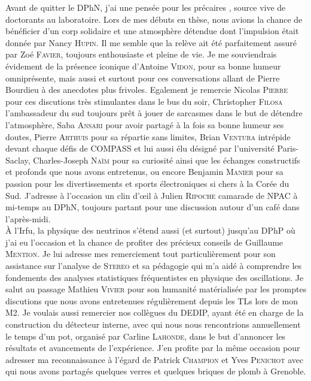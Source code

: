 Avant de quitter le DPhN, j'ai une pensée pour les \og précaires \fg{}, source vive de doctorants au laboratoire. Lors de mes débuts en thèse, nous avions la chance de bénéficier d'un corp solidaire et une atmosphère détendue dont l'impulsion était donnée par Nancy \textsc{Hupin}. Il me semble que la relève ait été parfaitement assuré par Zoé \textsc{Favier}, toujours enthousiaste et pleine de vie. Je me souviendrais évidement de la présence iconique d'Antoine \textsc{Vidon}, pour sa bonne humeur omniprésente, mais aussi et surtout pour ces conversations allant de Pierre Bourdieu à des anecdotes plus frivoles. Egalement je remercie Nicolas \textsc{Pierre} pour ces discutions très stimulantes dans le bus du soir, Christopher \textsc{Filosa} l'ambassadeur du sud toujours prêt à jouer de sarcasmes dans le but de détendre l'atmosphère, Saba \textsc{Ansari} pour avoir partagé à la fois sa bonne humeur ses doutes, Pierre \textsc{Arthuis} pour sa répartie sans limites, Brian \textsc{Ventura} intrépide devant chaque défis de COMPASS et lui aussi élu désigné par l'université Paris-Saclay, Charles-Joseph \textsc{Naïm} pour sa curiosité ainsi que les échanges constructifs et profonds que nous avons entretenus, ou encore Benjamin \textsc{Manier} pour sa passion pour les divertissements et sports électroniques si chers à la Corée du Sud. J'adresse à l'occasion un clin d'\oe il à Julien \textsc{Ripoche} camarade de NPAC à mi-temps au DPhN, toujours partant pour une discussion autour d'un café  dans l'après-midi. \\

À l'Irfu, la physique des neutrinos s'étend aussi (et surtout) jusqu'au DPhP où j'ai eu l'occasion et la chance de profiter des précieux conseils de Guillaume \textsc{Mention}. Je lui adresse mes remerciement tout particulièrement pour son assistance sur l'analyse de \textsc{Stereo} et sa pédagogie qui m'a aidé à comprendre les fondements des analyses statistiques fréquentistes en physique des oscillations. Je salut au passage Mathieu \textsc{Vivier} pour son humanité matérialisée par les promptes discutions que nous avons entretenues régulièrement depuis les TLs lors de mon M2. Je voulais aussi remercier nos collègues du DEDIP, ayant été en charge de la construction du détecteur interne, avec qui nous nous rencontrions annuellement le temps d'un pot, organisé par Carline \textsc{Lahonde}, dans le but d'annoncer les résultats et avancements de l'expérience. J'en profite par la même occasion pour adresser ma reconnaissance à l'égard de Patrick \textsc{Champion} et Yves \textsc{Penichot} avec qui nous avons partagés quelques verres et quelques briques de plomb à Grenoble.\\

